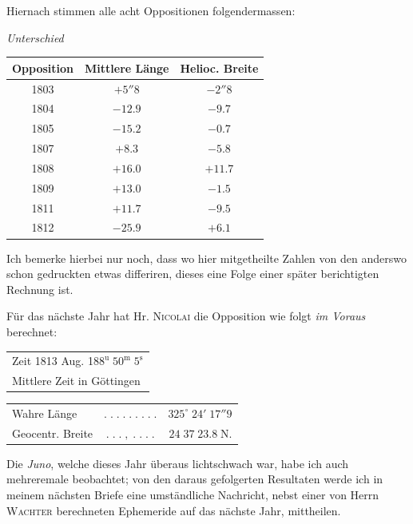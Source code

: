 \noindent Hiernach stimmen alle acht Oppositionen folgendermassen:

\begin{center}
\emph{Unterschied}
\end{center}

\begin{center}
\fontsize{10}{12}\selectfont\setlength{\tabcolsep}{6pt}\renewcommand{\arraystretch}{1.15}\begin{tabular}{c|c|c}
Opposition & Mittlere Länge & Helioc. Breite \\
\hline
1803 & $+5''8$ & $-2''8$ \\
1804 & $-12.9$ & $-9.7$ \\
1805 & $-15.2$ & $-0.7$ \\
1807 & $+8.3$ & $-5.8$ \\
1808 & $+16.0$ & $+11.7$ \\
1809 & $+13.0$ & $-1.5$ \\
1811 & $+11.7$ & $-9.5$ \\
1812 & $-25.9$ & $+6.1$ \\
\end{tabular}
\end{center}

\par\indent Ich bemerke hierbei nur noch, dass wo hier mitgetheilte Zahlen von den anderswo schon gedruckten
etwas differiren, dieses eine Folge einer später berichtigten Rechnung ist.

\par\indent Für das nächste Jahr hat Hr. \textsc{Nicolai} die Opposition wie folgt \emph{im Voraus} berechnet:
\begin{center}\fontsize{10}{12}\selectfont\setlength{\tabcolsep}{0pt}\renewcommand{\arraystretch}{1.15}\begin{tabular}{l}
Zeit 1813 Aug. 18\quad $8^{\mathrm u}\;50^{\mathrm m}\;5^{\mathrm s}$\\Mittlere Zeit in Göttingen
\end{tabular}\end{center}
\begin{center}\fontsize{10}{12}\selectfont\setlength{\tabcolsep}{2pt}\renewcommand{\arraystretch}{1.15}\begin{tabular}{lcr}
Wahre Länge & $.\;.\;.\;.\;.\;.\;.\;.\;.$ & $325^\circ\;24'\;17''9$\\
Geocentr. Breite & $.\;.\;.\;,\;.\;.\;.\;.$ & $24\;37\;23.8\;\mathrm{N}.$\\
\end{tabular}\end{center}

\par\indent Die \emph{Juno}, welche dieses Jahr überaus lichtschwach war, habe ich auch mehreremale beobachtet;
von den daraus gefolgerten Resultaten werde ich in meinem nächsten Briefe eine umständliche Nachricht,
nebst einer von Herrn \textsc{Wachter} berechneten Ephemeride auf das nächste Jahr, mittheilen.
